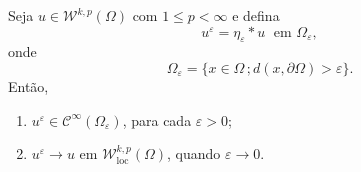 \documentclass[a4paper, 11pt]{book}
\theoremstyle{definition}
\newcommand{\cC}{\mathcal{C}}
\newcommand{\cW}{\mathcal{W}}
\begin{document}
\begin{tbox} \label{thm:aprox1}
    Seja $u \in \cW^{k,p}(\Omega)$ com $1 \leqslant p < \infty$ e defina
    \[
        u^{\varepsilon} = \eta_{\varepsilon} * u \;\text{ em } \Omega_\varepsilon,
    \]
    onde
    \[
        \Omega_\varepsilon = \{ x \in \Omega \,; d(x,\partial\Omega) > \varepsilon\}.
    \]
    Então,
    \begin{enumerate}[leftmargin=*, label=\textbf{(\alph*)}]
        \item $u^\varepsilon \in \cC^{\infty}(\Omega_\varepsilon)$, para cada $\varepsilon > 0$;
        \item $u^\varepsilon \to u$ em $\cW^{k,p}_{\mathrm{loc}}(\Omega)$, quando $\varepsilon \to 0$.
    \end{enumerate}
\end{tbox}
\end{document}
